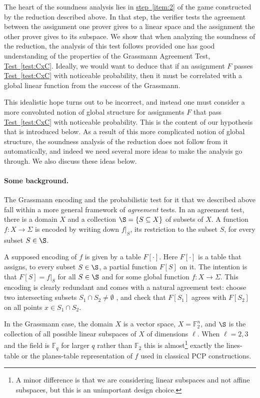 \documentclass[11pt]{article}
\numberwithin{equation}{section}
\theoremstyle{definition}
\theoremstyle{plain}
\newcommand{\expref}[2]{\hyperref[#2]{#1~\ref{#2}}}
\newcommand\set[1]{{\left\{ #1 \right\}}}
\renewcommand\subset{\subseteq}
\def\F{\mathbb{F}}
\begin{document}
The heart of the soundness analysis lies in \expref{step}{item:2} of the game constructed by the reduction described above.
In that step, the verifier tests the agreement between the assignment one prover gives to a linear space and the assignment the
other prover gives to its subspace. We show that when analyzing the soundness of the reduction, the analysis of this test follows
provided one has good understanding of the properties of the Grassmann Agreement Test, \expref{Test}{test:CxC}.
Ideally, we would want to deduce that if an assignment $F$ passes
%
\expref{Test}{test:CxC}  %
with noticeable probability, then
it must be correlated with a global linear function from the success of the Grassmann.

This idealistic hope turns out to be
incorrect, and instead one must consider a more convoluted notion of global structure for assignments $F$ that pass
%
\expref{Test}{test:CxC}  %
with noticeable probability. This is the content of our hypothesis that is introduced below. As a result
of this more complicated notion of global structure, the soundness analysis of the reduction does not follow from it automatically,
and indeed we need several more ideas to make the analysis go through. We also discuss these ideas below.



\paragraph{Some background.} The Grassmann encoding and the probabilistic test for it that
we described above fall within a more general framework of {\em
  agreement} tests.  In an agreement test, there is a domain $X$ and a
collection $\S = \set {S\subset X}$ of subsets of $X$. A function
$f:X\to\Sigma$ is encoded by writing down $f|_S$, its restriction to
the subset $S$, for every subset $S\in \S$.

A supposed encoding of $f$ is given by a table $F[\cdot]$. Here $F[\cdot]$ is a table that assigns, to every subset ${S\in\S}$, a partial function $F[S]$ on it. The intention is that $F[S] = f|_S$ for all $S\in \S$ and for some global function $f:X\to\Sigma$.
This encoding is clearly redundant and comes with a natural agreement test: choose two intersecting subsets $S_1\cap S_2\neq \emptyset$
%
, and check that $F[S_1]$ agrees with $F[S_2]$ on all points $x\in S_1\cap S_2$.

 In the Grassmann case, the domain $X$ is a vector space, $X=\F_2^n$, and $\S$ is
the collection of all possible linear subspaces of $X$ of dimensions
$\ell$. When $\ell=2,3$ and the field is $\F_q$ for larger $q$ rather than $\F_2$ this is almost\footnote{A minor difference is that we are considering linear subspaces and not affine subspaces, but this is an unimportant design choice.} exactly the lines-table or the planes-table representation of $f$ used in classical PCP constructions.
\end{document}
